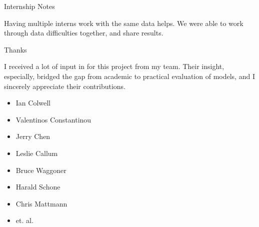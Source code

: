 \documentclass[10pt]{beamer}
\begin{document}

\begin{frame}{Internship Notes}


\vspace{1em}


  \vspace{1em}

  Having multiple interns work with the same data helps. We were able to work through
  data difficulties together, and share results.
\end{frame}


\begin{frame}{Thanks}

  I received a lot of input in for this project from my team.
  Their insight, especially, bridged the gap from academic to practical evaluation of models,
  and I sincerely appreciate their contributions.

  \begin{itemize}
  \item Ian Colwell
  \item Valentinos Constantinou
  \item Jerry Chen
  \item Leslie Callum
  \item Bruce Waggoner
  \item Harald Schone
  \item Chris Mattmann
  \item[] et. al.
  \end{itemize}


\end{frame}
\end{document}
